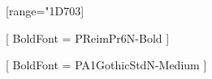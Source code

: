 

\usepackage[no-math,deluxe,expert]{luatexja-preset}

%

\setmainfont{STIX Two Text}
[range={"1D703}]


[
  BoldFont = {PReimPr6N-Bold}
]

[
  BoldFont = {PA1GothicStdN-Medium}
]
